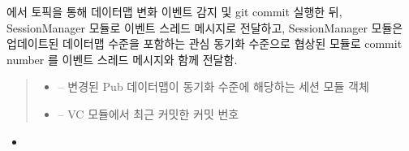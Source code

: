 \documentclass[a4paper,10pt,english]{sphinxmanual}
\begin{document}
\begin{fulllineitems}
\begin{fulllineitems}
\begin{itemize}
\end{itemize}



\end{fulllineitems}


\begin{fulllineitems}
\label{\detokenize{_SessionManager:SessionManager._sessionUpdatePubAsset}}
\pysigstartsignatures
{}
\pysigstopsignatures
\sphinxAtStartPar
{} 에서  토픽을 통해 데이터맵 변화 이벤트 감지 및 git commit 실행한 뒤,
SessionManager 모듈로  이벤트 스레드 메시지로 전달하고, SessionManager 모듈은 업데이트된 데이터맵 수준을 포함하는 관심 동기화 수준으로 협상된
{\hyperref[\detokenize{_Session:session}]{}} 모듈로 commit number 를  이벤트 스레드 메시지와 함께 전달함.
\begin{quote}\begin{description}
\begin{itemize}
\item {} 
\sphinxAtStartPar
{} – 변경된 Pub 데이터맵이 동기화 수준에 해당하는 세션 모듈 객체

\item {} 
\sphinxAtStartPar
{} – VC 모듈에서 최근 커밋한 커밋 번호

\end{itemize}

\end{description}\end{quote}


\nopagebreak

\begin{itemize}
\item {} 
\sphinxAtStartPar
{\hyperref[\detokenize{_Session:Session._smListener}]{}}


\end{itemize}
\end{fulllineitems}
\end{fulllineitems}
\end{document}
